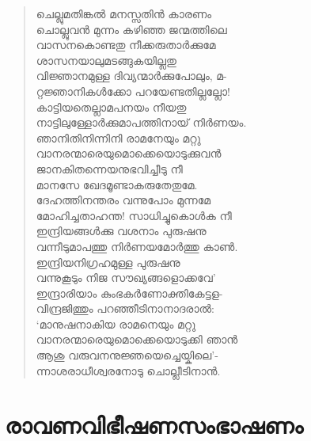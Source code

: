 \begin{verse}
ചെല്ലുമതിങ്കല്‍ മനസ്സതിന്‍ കാരണം\\
ചൊല്ലുവന്‍ മുന്നം കഴിഞ്ഞ ജന്മത്തിലെ\\
വാസനകൊണ്ടതു നീക്കരുതാര്‍ക്കുമേ\\
ശാസനയാലുമടങ്ങുകയില്ലതു\\
വിജ്ഞാനമുള്ള ദിവ്യന്മാര്‍ക്കുപോലും, മ-\\
റ്റജ്ഞാനികള്‍ക്കോ പറയേണ്ടതില്ലല്ലോ!\\
കാട്ടിയതെല്ലാമപനയം നീയതു\\
നാട്ടിലുള്ളോര്‍ക്കുമാപത്തിനായ് നിര്‍ണയം.\\
ഞാനിതിനിന്നിനി രാമനേയും മറ്റു\\
വാനരന്മാരെയുമൊക്കെയൊടുക്കുവന്‍\\
ജാനകിതന്നെയനുഭവിച്ചീടു നീ\\
മാനസേ ഖേദമൂണ്ടാകരുതേതുമേ.\\
ദേഹത്തിനന്തരം വന്നുപോം മുന്നമേ\\
മോഹിച്ചതാഹന്ത! സാധിച്ചുകൊള്‍ക നീ\\
ഇന്ദ്രിയങ്ങള്‍ക്കു വശനാം പുരുഷനു\\
വന്നീടുമാപത്തു നിര്‍ണയമോര്‍ത്തു കാണ്‍.\\
ഇന്ദ്രിയനിഗ്രഹമുള്ള പുരുഷനു\\
വന്നുകൂടും നിജ സൗഖ്യങ്ങളൊക്കവേ’\\
ഇന്ദ്രാരിയാം കുംഭകര്‍ണോക്തികേട്ടള-\\
വിന്ദ്രജിത്തും പറഞ്ഞീടിനാനാദരാല്‍:\\
‘മാനുഷനാകിയ രാമനെയും മറ്റു\\
വാനരന്മാരെയുമൊക്കെയൊടുക്കി ഞാന്‍\\
ആശു വരുവനനുജ്ഞയെച്ചെയ്കിലെ’-\\
ന്നാശരാധീശ്വരനോടു ചൊല്ലീടിനാന്‍.
\end{verse}


\section{രാവണവിഭീഷണസംഭാഷണം}

